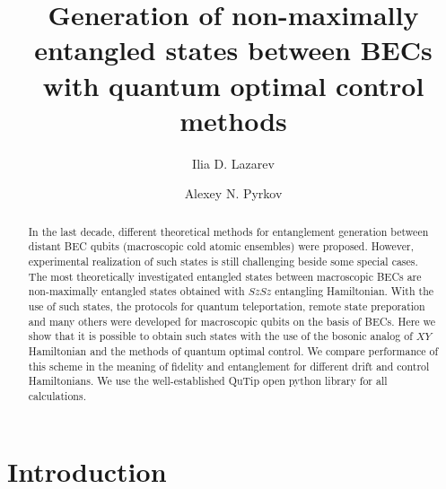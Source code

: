\documentclass[
aps,%
12pt,%
final,%
notitlepage,%
oneside,%
onecolumn,%
nobibnotes,%
nofootinbib,%
superscriptaddress,%
noshowpacs,%
centertags]%
{revtex4}
\begin{document}
\title{Generation of non-maximally entangled states between BECs with quantum optimal control methods}

\author{Ilia D. Lazarev}

\author{Alexey N. Pyrkov}


  
  


\begin{abstract}

In the last decade, different theoretical methods for entanglement generation between distant BEC qubits (macroscopic cold atomic ensembles) were proposed. However, experimental realization of such states is still challenging beside some special cases. The most theoretically investigated entangled states between macroscopic BECs are non-maximally entangled states obtained with $SzSz$ entangling Hamiltonian. With the use of such states, the protocols for quantum teleportation, remote state preporation and many others were developed for macroscopic qubits on the basis of BECs. Here we show that it is possible to obtain such states with the use of the bosonic analog of $XY$ Hamiltonian and the methods of quantum optimal control. We compare performance of this scheme in the meaning of fidelity and entanglement for different drift and control Hamiltonians. We use the well-established QuTip open python library for all calculations.

\end{abstract}


\maketitle

\section{Introduction}
\end{document}
